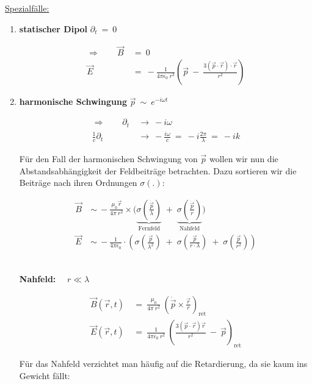 \newpage
\underline{Spezialfälle:}
\begin{enumerate}
\item \textbf{statischer Dipol} \qquad $\partial_t  \ = \ 0$

\begin{align*}
\Rightarrow \qquad \vec{B}  \ &= \ 0\\
\vec{E} \ &= \ - \frac{1}{4\pi\epsilon_0 \ r^3}\left(\vec{p} \ - \ \frac{3(\vec{p}\cdot\vec{r})\cdot\vec{r}}{r^2}\right)
\end{align*}

\item \textbf{harmonische Schwingung} \qquad $\vec{p} \ \sim \ e^{-i\omega t}$

\begin{align*}
\Rightarrow \qquad \partial_t \ &\rightarrow \ -i\omega\\
\frac{1}{c}\partial_t \ &\rightarrow \ - \frac{i\omega}{c}  \ = \ -i \frac{2\pi}{\lambda}  \ = \ -ik
\end{align*}

Für den Fall der harmonischen Schwingung von $\vec{p}$ wollen wir nun die Abstandsabhängigkeit der Feldbeiträge betrachten. Dazu sortieren wir die Beiträge nach ihren Ordnungen $\sigma(.)$:

\begin{align*}
\vec{B} \ &\sim \ - \frac{\mu_0 \vec{r}}{4\pi \ r^2} \times \Bigg(\underbrace{\sigma\left(\frac{\dot{\vec{p}}}{\lambda}\right)}_{\text{Fernfeld}} \; + \; \underbrace{\sigma\left(\frac{\dot{\vec{p}}}{r}\right)}_{\text{Nahfeld}}\Bigg)\\
\vec{E} \ &\sim \ - \frac{1}{4\pi\epsilon_0} \cdot \left(\sigma\left(\frac{\vec{p}}{\lambda^2}\right) \; + \; \sigma\left(\frac{\vec{p}}{r \cdot \lambda}\right) \; + \; \sigma\left(\frac{\vec{p}}{r^2}\right)\right)
\end{align*}

\ \\
\textbf{Nahfeld:} $\quad r \ll \lambda$

\begin{align*}
\vec{B}(\vec{r},t)  \ &= \ \frac{\mu_0}{4\pi\ r^2} \ \left(\dot{\vec{p}} \times \frac{\vec{r}}{r}\right)_{\text{ret}}\\
\vec{E}(\vec{r},t)  \ &= \ \frac{1}{4\pi\epsilon_0 \ r^2} \ \left(\frac{3(\vec{p}\cdot\vec{r})\vec{r}}{r^2} \ - \ \vec{p}\right)_{\text{ret}} 
\end{align*}

Für das Nahfeld verzichtet man häufig auf die Retardierung, da sie kaum ins Gewicht fällt:


\end{enumerate}
